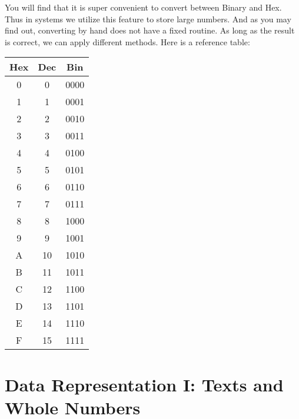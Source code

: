 \documentclass{article}
\begin{document}
You will find that it is super convenient to convert between  Binary and Hex. Thus in systems we utilize this feature to store large numbers. And as you may find out, converting by hand does not have a fixed routine. As long as the result is correct, we can apply different methods. Here is a reference table:\\
\begin{center}
\begin{tabular}{|c|c|c|}
\hline
\textbf{Hex} & \textbf{Dec} & \textbf{Bin} \\
\hline
0 & 0 & 0000 \\
\hline
1 & 1 & 0001 \\
\hline
2 & 2 & 0010 \\
\hline
3 & 3 & 0011 \\
\hline
4 & 4 & 0100 \\
\hline
5 & 5 & 0101 \\
\hline
6 & 6 & 0110 \\
\hline
7 & 7 & 0111 \\
\hline
8 & 8 & 1000 \\
\hline
9 & 9 & 1001 \\
\hline
A & 10 & 1010 \\
\hline
B & 11 & 1011 \\
\hline
C & 12 & 1100 \\
\hline
D & 13 & 1101 \\
\hline
E & 14 & 1110 \\
\hline
F & 15 & 1111 \\
\hline
\end{tabular}
\end{center}
\newpage

\section{Data Representation I: Texts and Whole Numbers}
\end{document}
